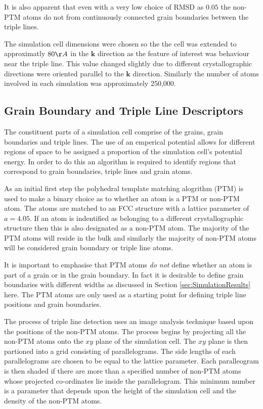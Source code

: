 \documentclass[12pt,a4paper]{book}
\begin{document}
It is also apparent that even with a very low choice of RMSD as $0.05$ the non-PTM atoms do not from continuously connected grain boundaries between the triple lines.

The simulation cell dimensions were chosen so the the cell was extended to approximatly $80 \AA$ in the $\mathbf{k}$ direction as the feature of interest was behaviour near the triple line. This value changed slightly due to different crystallographic directions were oriented parallel to the $\mathbf{k}$ direction. Similarly the number of atoms involved in each simulation was approximately 250,000.  


\subsection{Grain Boundary and Triple Line Descriptors}

The constituent parts of a simulation cell comprise of the grains, grain boundaries and triple lines. The use of an emperical potential allows for different regions of space to be assigned a proportion of the simulation cell's potential energy. In order to do this an algorithm is required to identify regions that correspond to grain boundaries, triple lines and grain atoms.

As an initial first step the polyhedral template matching alogrithm (PTM) is used to make a binary choice as to whether an atom is a PTM or non-PTM atom. The atoms are matched to an FCC structure with a lattice parameter of $a=4.05$. If an atom is indentified as belonging to a different crystallographic structure then this is also designated as a non-PTM atom. The majority of the PTM atoms will reside in the bulk and similarly the majority of non-PTM atoms will be considered grain boundary or triple line atoms. 

It is important to emphasise that PTM atoms \emph{do not} define whether an atom is part of a grain or in the grain boundary. In fact it is desirable to define grain boundaries with different widths as discussed in Section \ref{sec:SimulationResults} here. The PTM atoms are only used as a starting point for defining triple line positions and grain boundaries.

The process of triple line detection uses an image analysis technique based upon the positions of the non-PTM atoms. The process begins by projecting all the non-PTM atoms onto the $xy$ plane of the simulation cell. The $xy$ plane is then partioned into a grid consisting of parallelograms. The side lengths of each parallelograms are chosen to be equal to the lattice parameter. Each paralleogram is then shaded if there are more than a specified number of non-PTM atoms whose projected co-ordinates lie inside the parallelogram. This minimum number is a parameter that depends upon the height of the simulation cell and the density of the non-PTM atoms.
\end{document}
